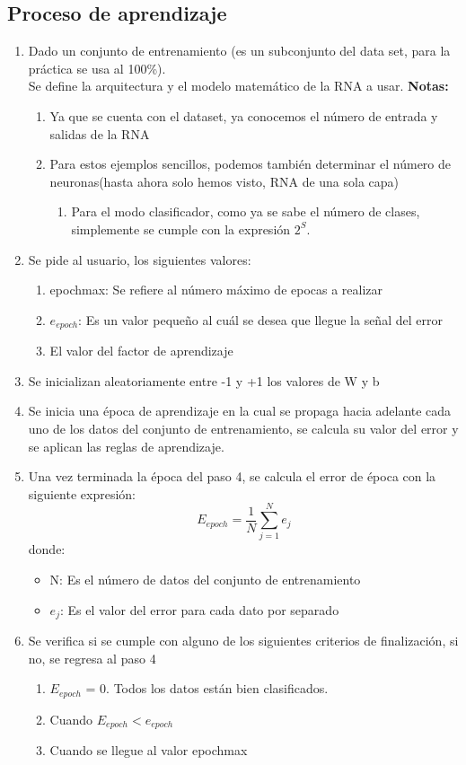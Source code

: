 \documentclass{article}
\begin{document}
\subsection{Proceso de aprendizaje}
\begin{enumerate}
	\item Dado un conjunto de entrenamiento (es un subconjunto del data set, para la práctica se usa al 100\%).\\
	Se define la arquitectura y el modelo matemático de la RNA a usar.
	\textbf{Notas:}
	\begin{enumerate}
		\item Ya que se cuenta con el dataset, ya conocemos el número de entrada y salidas de la RNA
		\item Para estos ejemplos sencillos, podemos también determinar el número de neuronas(hasta ahora solo hemos visto, RNA de una sola capa)
		\begin{enumerate}
			\item Para el modo clasificador, como ya se sabe el número de clases, simplemente se cumple con la expresión $2^S$.\textsl{}
		\end{enumerate}
	\end{enumerate}
	\item Se pide al usuario, los siguientes valores:
	\begin{enumerate}
		\item epochmax: Se refiere al número máximo de epocas a realizar
		\item $e_{epoch}$: Es un valor pequeño al cuál se desea que llegue la señal del error
		\item El valor del factor de aprendizaje 
	\end{enumerate}
	\item Se inicializan aleatoriamente entre -1 y +1 los valores de W y b
	\item Se inicia una época de aprendizaje en la cual se propaga hacia adelante cada uno de los datos del conjunto de entrenamiento, se calcula su valor del error y se aplican las reglas de aprendizaje.
	\item Una vez terminada la época del paso 4, se calcula el error de época con la siguiente expresión:
	$$ E_{epoch} = \frac{1}{N}\sum_{j=1}^{N}e_j$$
	donde:
	\begin{itemize}
		\item N: Es el número de datos del conjunto de entrenamiento
		\item $e_j$: Es el valor del error para cada dato por separado
	\end{itemize}
	\item Se verifica si se cumple con alguno de los siguientes criterios de finalización, si no, se regresa al paso 4
	\begin{enumerate}
		\item $E_{epoch}$ = 0. Todos los datos están bien clasificados.
		\item Cuando $E_{epoch} < e_{epoch}$ 
		\item Cuando se llegue al valor epochmax
	\end{enumerate}
\end{enumerate}
\end{document}
